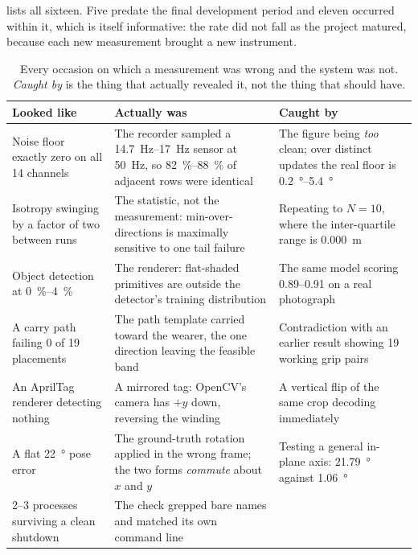  lists all sixteen. Five predate the final development period
and eleven occurred within it, which is itself informative: the rate did not
fall as the project matured, because each new measurement brought a new
instrument.

\begin{table}[htbp]
  \centering
  \caption{Every occasion on which a measurement was wrong and the system was
  not. \emph{Caught by} is the thing that actually revealed it, not the thing
  that should have.}
  \label{tab:instr}
  \footnotesize
  \begin{tabular}{@{}p{32mm}p{45mm}p{45mm}@{}}
    \toprule
    Looked like & Actually was & Caught by \\
    \midrule
    Noise floor exactly zero on all 14 channels
      & The recorder sampled a \SIrange{14.7}{17}{\hertz} sensor at
        \SI{50}{\hertz}, so \SIrange{82}{88}{\percent} of adjacent rows were
        identical
      & The figure being \emph{too} clean; over distinct updates the real
        floor is \SIrange{0.2}{5.4}{\degree} \\
    Isotropy swinging by a factor of two between runs
      & The statistic, not the measurement: min-over-directions is maximally
        sensitive to one tail failure
      & Repeating to $N=10$, where the inter-quartile range is
        \SI{0.000}{\metre} \\
    Object detection at \SIrange{0}{4}{\percent}
      & The renderer: flat-shaded primitives are outside the detector's
        training distribution
      & The same model scoring \numrange{0.89}{0.91} on a real photograph \\
    A carry path failing 0 of 19 placements
      & The path template carried toward the wearer, the one direction leaving
        the feasible band
      & Contradiction with an earlier result showing 19 working grip pairs \\
    An {AprilTag} renderer detecting nothing
      & A mirrored tag: {OpenCV}'s camera has $+y$ down, reversing the winding
      & A vertical flip of the same crop decoding immediately \\
    A flat \SI{22}{\degree} pose error
      & The ground-truth rotation applied in the wrong frame; the two forms
        \emph{commute} about $x$ and $y$
      & Testing a general in-plane axis: \SI{21.79}{\degree} against
        \SI{1.06}{\degree} \\
    2--3 processes surviving a clean shutdown
      & The check grepped bare names and matched its own command line

\end{tabular}
\end{table}
